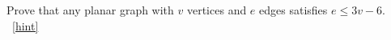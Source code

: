 \documentclass{book}
\begin{document}
\setcounter{project}{30}
\addtocounter{project}{-1}
\begin{activity}[]\label{activity-25}
\hypertarget{p-311}{}%
Prove that any planar graph with \(v\) vertices and \(e\) edges satisfies \(e \le 3v - 6\).%
~\hfill{\tiny\hyperlink{a-30}{[hint]}\hypertarget{q-30}{}}\end{activity}
\end{document}
